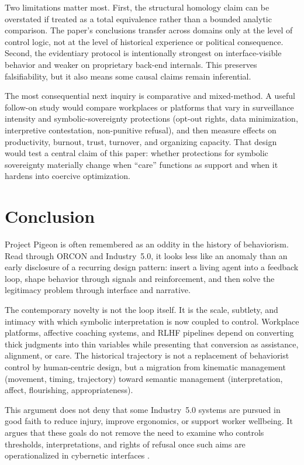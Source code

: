 \documentclass[runningheads]{llncs}
\begin{document}
Two limitations matter most. First, the structural homology claim can be overstated if treated as a total equivalence rather than a bounded analytic comparison. The paper's conclusions transfer across domains only at the level of control logic, not at the level of historical experience or political consequence. Second, the evidentiary protocol is intentionally strongest on interface-visible behavior and weaker on proprietary back-end internals. This preserves falsifiability, but it also means some causal claims remain inferential.

The most consequential next inquiry is comparative and mixed-method. A useful follow-on study would compare workplaces or platforms that vary in surveillance intensity and symbolic-sovereignty protections (opt-out rights, data minimization, interpretive contestation, non-punitive refusal), and then measure effects on productivity, burnout, trust, turnover, and organizing capacity. That design would test a central claim of this paper: whether protections for symbolic sovereignty materially change when ``care'' functions as support and when it hardens into coercive optimization.

\section{Conclusion}

Project Pigeon is often remembered as an oddity in the history of behaviorism. Read through ORCON and Industry~5.0, it looks less like an anomaly than an early disclosure of a recurring design pattern: insert a living agent into a feedback loop, shape behavior through signals and reinforcement, and then solve the legitimacy problem through interface and narrative.

The contemporary novelty is not the loop itself. It is the scale, subtlety, and intimacy with which symbolic interpretation is now coupled to control. Workplace platforms, affective coaching systems, and RLHF pipelines depend on converting thick judgments into thin variables while presenting that conversion as assistance, alignment, or care. The historical trajectory is not a replacement of behaviorist control by human-centric design, but a migration from kinematic management (movement, timing, trajectory) toward semantic management (interpretation, affect, flourishing, appropriateness).

This argument does not deny that some Industry~5.0 systems are pursued in good faith to reduce injury, improve ergonomics, or support worker wellbeing. It argues that these goals do not remove the need to examine who controls thresholds, interpretations, and rights of refusal once such aims are operationalized in cybernetic interfaces \cite{breque2021industry}.
\end{document}
